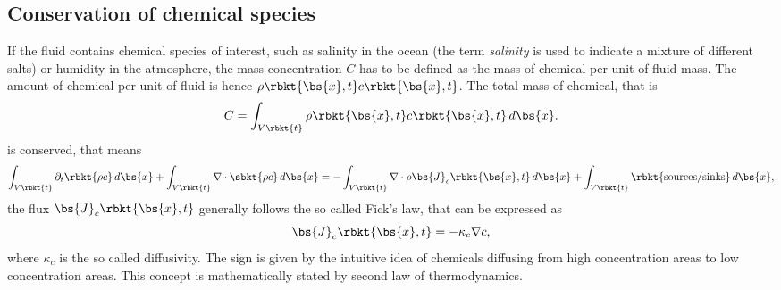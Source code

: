 \subsection{Conservation of chemical species}
If the fluid contains chemical species of interest, such as salinity in the ocean (the term \emph{salinity} is used to indicate a mixture of different salts) or humidity in the atmosphere, the mass concentration $C$ has to be defined as the mass of chemical per unit of fluid mass. The amount of chemical per unit of fluid is hence $\rho\rbkt{\bs{x},t}c\rbkt{\bs{x},t}$. The total mass of chemical, that is 
\begin{equation}
    C =  \int_{V\rbkt{t}}\rho\rbkt{\bs{x},t}c\rbkt{\bs{x},t}\,d\bs{x}.
\end{equation}
is conserved, that means 
\begin{equation}
    \int_{V\rbkt{t}} \partial_{t}\rbkt{\rho c}\,d\bs{x} + \int_{V\rbkt{t}} \nabla\cdot\sbkt{\rho c}\,d\bs{x}
    = - \int_{V\rbkt{t}} \nabla\cdot \rho\bs{J}_{c}\rbkt{\bs{x},t} \,d\bs{x} + \int_{V\rbkt{t}} \rbkt{\text{sources/sinks}}\,d\bs{x},
\end{equation}
the flux $\bs{J}_{c}\rbkt{\bs{x},t}$ generally follows the so called Fick's law, that can be expressed as
\begin{equation}\label{eq:Fick}
    \bs{J}_{c}\rbkt{\bs{x},t} = -\kappa_{c}\nabla c,
\end{equation}
where $\kappa_{c}$ is the so called diffusivity. The sign is given by the intuitive idea of chemicals diffusing from high concentration areas to low concentration areas. This concept is mathematically stated by second law of thermodynamics.

